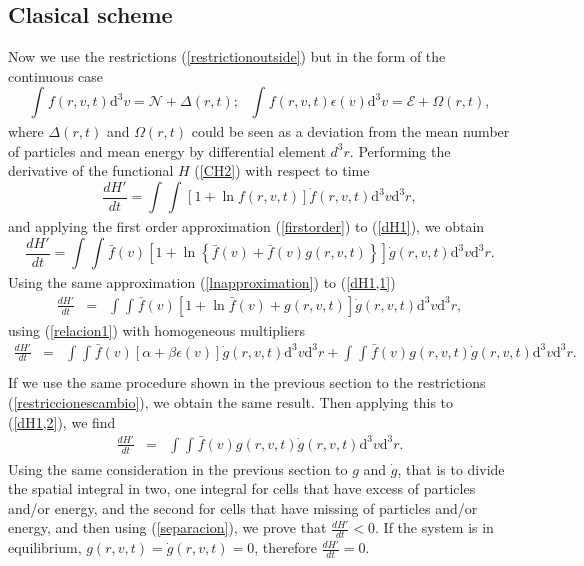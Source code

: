 \documentclass{article}
\begin{document}
\subsection{Clasical scheme}
Now we use the restrictions (\ref{restrictionoutside}) but in the form of the continuous case
\begin{equation}
    \int_{}^{}f(r,v,t)\mathrm{d}^3v=\mathcal{N}+\Delta(r,t); \ \ \ \int_{}^{}f(r,v,t)\epsilon(v)\mathrm{d}^3v=\mathcal{E}+\Omega(r,t)\label{restriccionescambio},
\end{equation}{}
where $\Delta(r,t)$ and $\Omega(r,t)$ could be seen as a deviation from the mean number of particles and mean energy by differential element $d^3r$.
Performing the derivative of the functional $H$ (\ref{CH2}) with respect to time
\begin{equation}
    \frac{dH'}{dt}=\int_{}^{}\int_{}^{}\left[ 1+\ln f(r,v,t) \right]\dot f(r,v,t) \mathrm{d}^3v \mathrm{d}^3r \label{dH1},
\end{equation}{}
and applying the first order approximation (\ref{firstorder}) to (\ref{dH1}), we obtain
\begin{equation}
    \frac{dH'}{dt}=\int_{}^{}\int_{}^{}\bar f(v) \left [ 1+\ln \left\{ \bar f(v)+\bar f(v)g(r,v,t) \right\} \right]\dot g(r,v,t)\mathrm{d}^3v \mathrm{d}^3r \label{dH1,1}.
\end{equation}{}
Using the same approximation (\ref{lnapproximation})
to (\ref{dH1,1}) 
\begin{eqnarray}
\frac{dH'}{dt}&=&\int_{}^{} \int_{}^{} \bar f(v)\left[ 1+\ln \bar f(v)+g(r,v,t) \right]\dot g(r,v,t)\mathrm{d}^3v \mathrm{d}^3r,
\end{eqnarray}{}
using (\ref{relacion1}) with homogeneous multipliers
\begin{eqnarray}
\frac{dH'}{dt}&=&\int_{}^{}\int_{}^{}\bar f(v)\left[ \alpha+\beta \epsilon(v) \right]\dot g(r,v,t)\mathrm{d}^3v \mathrm{d}^3r+\int_{}^{}\int_{}^{}\bar f(v)g(r,v,t)\dot g(r,v,t)\mathrm{d}^3v \mathrm{d}^3r \label{dH1,2}. \nonumber \\
\end{eqnarray}{}
If we use the same procedure shown in the previous section to the restrictions (\ref{restriccionescambio}), we obtain the same result. Then applying this to (\ref{dH1,2}), we find
\begin{eqnarray}
\frac{dH'}{dt}&=&\int_{}^{}\int_{}^{}\bar f(v)g(r,v,t)\dot g(r,v,t)\mathrm{d}^3v \mathrm{d}^3r.
\end{eqnarray}{}
Using the same consideration in the previous section to $g$ and $\dot g$, that is to divide the spatial integral in two, one integral for cells that have excess of particles and/or energy, and the second for cells that have missing of particles and/or energy, and then using (\ref{separacion}), we prove that $\frac{dH'}{dt}<0$. If the system is in equilibrium, $g(r,v,t)=\dot g(r,v,t)=0$, therefore $\frac{dH'}{dt}=0$. 
\end{document}
